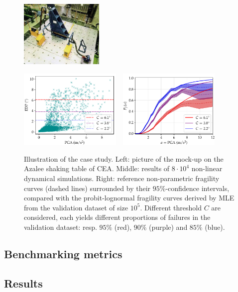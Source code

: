 \begin{figure}[h]
    \centering
    \parbox[b][3.8cm][c]{4.5cm}{%
    \includegraphics[height=3.2cm]{figures/intro-frags/ASG.jpg}\vspace*{1em}%
    }
    \includegraphics[height=3.8cm]{figures/intro-frags/asg/cloud_PGA_light.pdf}\ \ 
    \includegraphics[height=3.8cm]{figures/intro-frags/asg/refs_PGA.pdf}
    \caption{Illustration of the case study. Left: picture of the mock-up on the Azalee shaking table of CEA. Middle: results of $8\cdot10^4$ non-linear dynamical simulations. Right: reference non-parametric fragility curves (dashed lines) surrounded by their $95\%$-confidence intervals, compared with the probit-lognormal fragility curves derived by MLE from the validation dataset of size $10^5$. Different threshold $C$ are considered, each yields different proportions of failures in the validation dataset: resp. $95\%$ (red), $90\%$ (purple) and $85\%$ (blue).}
    \label{fig:constr-frag:asg}
\end{figure}



\subsection{Benchmarking metrics}


\subsection{Results}



